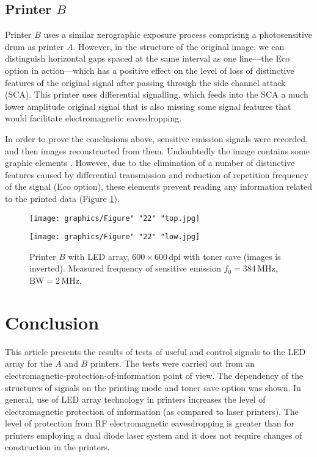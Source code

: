 \documentclass[12pt,a4paper]{article}
\begin{document}
\subsection{Printer $B$}

Printer $B$ uses a similar xerographic exposure process comprising a
photosensitive drum as printer $A$. However, in the structure of the original
image, we can distinguish horizontal gaps spaced at the same interval as one
line---the Eco option in action---which has a positive effect on the level of
loss of distinctive features of the original signal after passing through the
side channel attack (SCA). This printer uses differential signalling, which
feeds into the SCA a much lower amplitude original signal that is also
missing some signal features that would facilitate electromagnetic
eavesdropping.

In order to prove the conclusions above, sensitive emission signals were
recorded, and then images reconstructed from them. Undoubtedly the image
contains some graphic elements \cite{Jalilian2014a}. However, due to the
elimination of a number of distinctive features caused by differential
transmission and reduction of repetition frequency of the signal (Eco
option), these elements prevent reading any information related to the
printed data (Figure \ref{figure:Figure_22}).

\begin{figure}[ht]
    \centering
    \texttt{[image: graphics/Figure" "22" "top.jpg]}

    \bigskip

    \texttt{[image: graphics/Figure" "22" "low.jpg]}
    \caption{Printer $B$ with LED array, $600\times 600$\,dpi with toner
        save (images is inverted). Measured frequency of sensitive emission
        $f_0 = 384$\,\si{\mega\hertz}, $\text{BW}=2$\,\si{\mega\hertz}.}
    \label{figure:Figure_22}
\end{figure}

\section{Conclusion}

This article presents the results of tests of useful and control signals to
the LED array for the $A$ and $B$ printers. The tests were carried out from
an electromagnetic-protection-of-information point of view. The dependency of
the structures of signals on the printing mode and toner save option was
shown. In general, use of LED array technology in printers increases the
level of electromagnetic protection of information (as compared to laser
printers). The level of protection from RF electromagnetic eavesdropping is
greater than for printers employing a dual diode laser system
\cite{Kubiak2018c} and it does not require changes of construction in the
printers.
\end{document}
